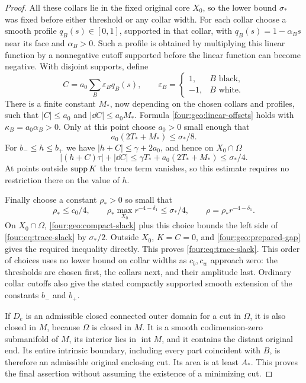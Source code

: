 \begin{proof}
All these collars lie in the fixed original core $X_0$, so the lower
bound $\sigma_*$ was fixed before either threshold or any collar width.
For each collar choose a smooth profile $q_B(s)\in[0,1]$, supported in
that collar, with $q_B(s)=1-\alpha_Bs$ near its face and
$\alpha_B>0$.  Such a profile is obtained by multiplying this linear
function by a nonnegative cutoff supported before the linear function
can become negative.  With disjoint supports, define
\[
 C=a_0\sum_B\varepsilon_Bq_B(s),\qquad
 \varepsilon_B=\begin{cases}1,&B\text{ black},\\-1,&B\text{ white}.
 \end{cases}
\]
There is a finite constant $M_*$, now depending on the chosen collars and
profiles, such that $|C|\le a_0$ and $|\dd C|\le a_0M_*$.  Formula
\eqref{four:geo:linear-offsets} holds with $\kappa_B=a_0\alpha_B>0$.
Only at this point choose $a_0>0$ small enough that
\begin{equation}\label{four:geo:amplitude-budget}
 a_0(2T_*+M_*)\le\sigma_*/8.
\end{equation}
For $b_-\le h\le b_+$ we have $|h+C|\le\gamma+2a_0$, and hence on
$X_0\cap\Omega$
\begin{equation}\label{four:geo:compact-slack}
 |(h+C)\tau|+|\dd C|
 \le\gamma T_*+a_0(2T_*+M_*)\le\sigma_*/4.
\end{equation}
At points outside $\operatorname{supp} K$ the trace term vanishes, so this estimate
requires no restriction there on the value of $h$.

Finally choose a constant $\rho_*>0$ so small that
\[
 \rho_*\le c_0/4,\qquad
 \rho_*\max_{X_0}r^{-4-\delta_1}\le\sigma_*/4,
 \qquad \rho=\rho_* r^{-4-\delta_1}.
\]
On $X_0\cap\Omega$, \eqref{four:geo:compact-slack} plus this choice bounds the
left side of \eqref{four:eq:trace-slack} by $\sigma_*/2$.  Outside $X_0$,
$K=C=0$, and \eqref{four:geo:prepared-gap} gives the required inequality
directly.  This proves \eqref{four:eq:trace-slack}.  This order of choices uses
no lower bound on collar widths as $c_b,c_w$ approach zero: the thresholds
are chosen first, the collars next, and their amplitude last.  Ordinary
collar cutoffs also give the stated compactly supported smooth extension
of the constants $b_-$ and $b_+$.

If $D_e$ is an admissible closed connected outer domain for a cut in
$\Omega$, it is also closed in $M$, because $\Omega$ is closed in $M$.
It is a smooth codimension-zero submanifold of $M$, its interior lies in
$\operatorname{int}M$, and it contains the distant original end.  Its
entire intrinsic boundary, including every part coincident with $B$, is
therefore an admissible original enclosing cut.  Its area is at least
$A_*$.  This proves the final assertion without assuming the existence of
a minimizing cut.
\end{proof}
